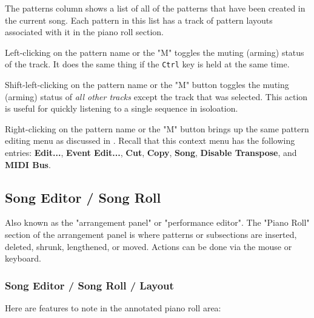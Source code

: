    The patterns column shows a list of all of the patterns that have been
   created in the current song.  Each pattern in this list has a track of
   pattern layouts associated with it in the piano roll section.

   Left-clicking on the pattern name or the "M" toggles the muting
   (arming) status of the track.
   It does the same thing if the \texttt{Ctrl} key is held at the same time.

   Shift-left-clicking on the pattern name or the "M" button toggles the muting
   (arming) status of \textsl{all other tracks} except the track that was
   selected.  This action is useful for quickly listening to a single sequence
   in isoloation.

   Right-clicking on the pattern name or the "M" button brings up the same
   pattern editing menu as discussed in
   .
   Recall that this context menu has the following entries:
   \textbf{Edit...}, \textbf{Event Edit...}, \textbf{Cut}, \textbf{Copy},
   \textbf{Song}, \textbf{Disable Transpose}, and \textbf{MIDI Bus}.

\subsection{Song Editor / Song Roll}
\label{subsec:song_editor_song_roll}

   Also known as the "arrangement panel" or "performance editor".
   The "Piano Roll" section of the arrangement panel is where patterns or
   subsections are inserted, deleted, shrunk, lengthened, or moved.
   Actions can be done via the mouse or keyboard.

\subsubsection{Song Editor / Song Roll / Layout}
\label{subsubsec:song_editor_song_roll_layout}

   Here are features to note in the annotated piano roll area:

